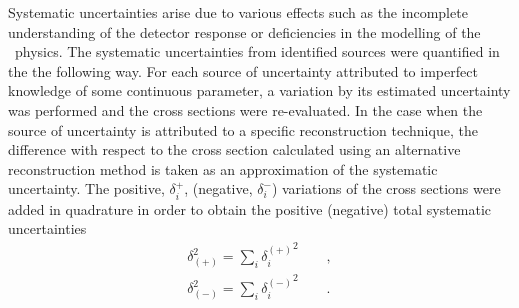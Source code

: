 Systematic uncertainties arise due to various effects such as the incomplete understanding of the detector response or deficiencies in the modelling of the \ep~physics. The systematic uncertainties from identified sources were quantified in the the following way. For each source of uncertainty attributed to imperfect knowledge of some continuous parameter, a variation by its estimated uncertainty was performed and the cross sections were re-evaluated. In the case when the source of uncertainty is attributed to a specific reconstruction technique, the difference with respect to the cross section calculated using an alternative reconstruction method is taken as an approximation of the systematic uncertainty. The positive, $\delta^+_i$, (negative, $\delta^-_i$) variations of the cross sections were added in quadrature in order to obtain the positive (negative) total systematic uncertainties
\[
	\begin{aligned}
		\delta_{\left( +\right)}^{2} = \sum_i{\mbox{$\delta_i^{\left( +\right)}$}^2}\qquad,\\
		\delta_{\left( -\right)}^{2} = \sum_i{\mbox{$\delta_i^{\left( -\right)}$}^2}\qquad.
	\end{aligned}
\]

